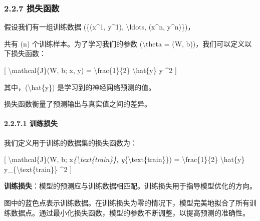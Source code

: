 \subsubsection{\texorpdfstring{\textbf{2.2.7
损失函数}}{2.2.7 损失函数}}\label{227-ux635fux5931ux51fdux6570}

假设我们有一组训练数据 (\{(x\^{}1, y\^{}1), \textbackslash ldots,
(x\^{}n, y\^{}n)\})，


共有 (n) 个训练样本。为了学习我们的参数 (\textbackslash theta = (W,
b))，我们可以定义以下损失函数：

{[} \textbackslash mathcal\{J\}(W, b; x, y) =
\textbackslash frac\{1\}\{2\} \textbar{} \textbackslash hat\{y\} y
\textbar{}\^{}2 {]}


其中，(\textbackslash hat\{y\}) 是学习到的神经网络预测的值。

损失函数衡量了预测输出与真实值之间的差异。

\paragraph{\texorpdfstring{\textbf{2.2.7.1
训练损失}}{2.2.7.1 训练损失}}\label{2271-ux8badux7ec3ux635fux5931}

我们定义用于训练的数据集的损失函数为：

{[} \textbackslash mathcal\{J\}(W, b;
x\emph{\{\textbackslash text\{train\}\},
y}\{\textbackslash text\{train\}\}) = \textbackslash frac\{1\}\{2\}
\textbar{} \textbackslash hat\{y\} y\_\{\textbackslash text\{train\}\}
\textbar{}\^{}2 {]}


\textbf{训练损失}：模型的预测应与训练数据相匹配。训练损失用于指导模型优化的方向。

图中的蓝色点表示训练数据。在训练损失为零的情况下，模型完美地拟合了所有训练数据点。通过最小化损失函数，模型的参数不断调整，以提高预测的准确性。



